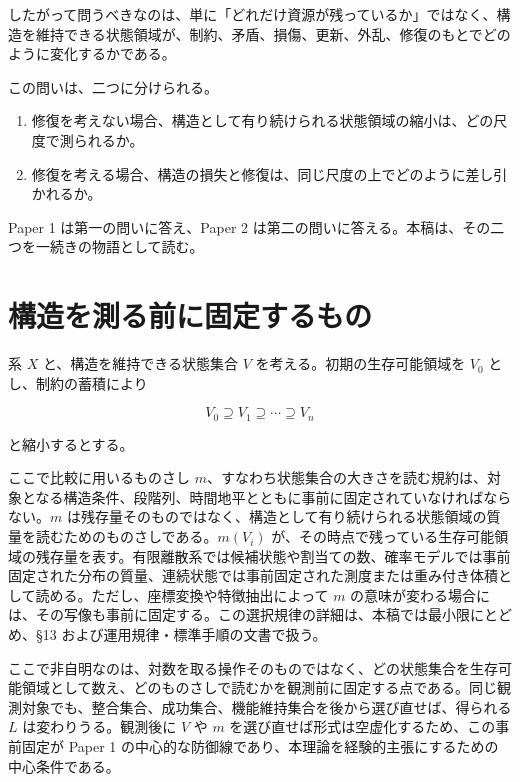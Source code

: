 \documentclass[12pt,a4paper]{article}
\begin{document}
したがって問うべきなのは、単に「どれだけ資源が残っているか」ではなく、構造を維持できる状態領域が、制約、矛盾、損傷、更新、外乱、修復のもとでどのように変化するかである。

この問いは、二つに分けられる。

\begin{enumerate}
\def\labelenumi{\arabic{enumi}.}
\tightlist
\item
  修復を考えない場合、構造として有り続けられる状態領域の縮小は、どの尺度で測られるか。
\item
  修復を考える場合、構造の損失と修復は、同じ尺度の上でどのように差し引かれるか。
\end{enumerate}

Paper 1 は第一の問いに答え、Paper 2 は第二の問いに答える。本稿は、その二つを一続きの物語として読む。

\section{構造を測る前に固定するもの}\label{ux69cbux9020ux3092ux6e2cux308bux524dux306bux56faux5b9aux3059ux308bux3082ux306e}

系 \(X\) と、構造を維持できる状態集合 \(V\) を考える。初期の生存可能領域を \(V_0\) とし、制約の蓄積により

\[
V_0 \supseteq V_1 \supseteq \cdots \supseteq V_{n}
\]

と縮小するとする。

ここで比較に用いるものさし \(m\)、すなわち状態集合の大きさを読む規約は、対象となる構造条件、段階列、時間地平とともに事前に固定されていなければならない。\(m\) は残存量そのものではなく、構造として有り続けられる状態領域の質量を読むためのものさしである。\(m(V_{i})\) が、その時点で残っている生存可能領域の残存量を表す。有限離散系では候補状態や割当ての数、確率モデルでは事前固定された分布の質量、連続状態では事前固定された測度または重み付き体積として読める。ただし、座標変換や特徴抽出によって \(m\) の意味が変わる場合には、その写像も事前に固定する。この選択規律の詳細は、本稿では最小限にとどめ、§13 および運用規律・標準手順の文書で扱う。

ここで非自明なのは、対数を取る操作そのものではなく、どの状態集合を生存可能領域として数え、どのものさしで読むかを観測前に固定する点である。同じ観測対象でも、整合集合、成功集合、機能維持集合を後から選び直せば、得られる \(L\) は変わりうる。観測後に \(V\) や \(m\) を選び直せば形式は空虚化するため、この事前固定が Paper 1 の中心的な防御線であり、本理論を経験的主張にするための中心条件である。
\end{document}
